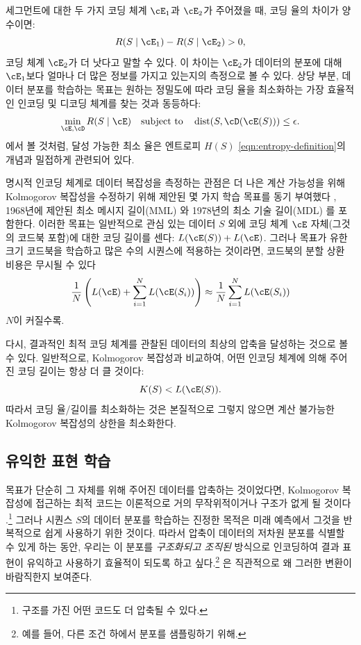 \documentclass[../../book-main_ko.tex]{subfiles}
\begin{document}
세그먼트에 대한 두 가지 코딩 체계 \(\cE_{1}\)과 \(\cE_{2}\)가 주어졌을 때, 코딩 율의 차이가 양수이면:
\begin{equation}
   R(S \mid \cE_{1}) -  R(S \mid \cE_{2}) > 0,
\end{equation}
코딩 체계 \(\cE_{2}\)가 더 낫다고 말할 수 있다. 이 차이는 \(\cE_{2}\)가 데이터의 분포에 대해 \(\cE_{1}\)보다 얼마나 더 많은 정보를 가지고 있는지의 측정으로 볼 수 있다. 상당 부분, 데이터 분포를 학습하는 목표는 원하는 정밀도에 따라 코딩 율을 최소화하는 가장 효율적인 인코딩 및 디코딩 체계를 찾는 것과 동등하다:
\begin{equation}
   \min_{\cE, \cD} R(S \mid \cE) \quad \text{subject to} \quad \operatorname{dist}(S, \cD(\cE(S))) \leq \epsilon.
\end{equation}
에서 볼 것처럼, 달성 가능한 최소 율은 엔트로피 \(H(S)\) \eqref{eqn:entropy-definition}의 개념과 밀접하게 관련되어 있다.


\begin{remark}\label{rem:computable-complexity}
    명시적 인코딩 체계로 데이터 복잡성을 측정하는 관점은 더 나은 계산 가능성을 위해 Kolmogorov 복잡성을 수정하기 위해 제안된 몇 가지 학습 목표를 동기 부여했다 \cite{WallaceC1999}, 1968년에 제안된 최소 메시지 길이(MML) \cite{WallaceC1968}와 1978년의 최소 기술 길이(MDL) \cite{Rissanen-1978,HansenM2001}를 포함한다. 이러한 목표는 일반적으로 관심 있는 데이터 \(S\) 외에 코딩 체계 \(\cE\) 자체(그것의 코드북 포함)에 대한 코딩 길이를 센다: \(L(\cE(S)) + L(\cE)\). 그러나 목표가 유한 크기 코드북을 학습하고 많은 수의 시퀀스에 적용하는 것이라면, 코드북의 분할 상환 비용은 무시될 수 있다
    \begin{equation}
        \frac{1}{N}\left( L(\cE) + \sum_{i=1}^{N} L(\cE(S_{i}))\right) \approx \frac{1}{N}\sum_{i=1}^{N} L(\cE(S_{i}))
    \end{equation}
    \(N\)이 커질수록.
\end{remark}

다시, 결과적인 최적 코딩 체계를 관찰된 데이터의 최상의 압축을 달성하는 것으로 볼 수 있다. 일반적으로, Kolmogorov 복잡성과 비교하여, 어떤 인코딩 체계에 의해 주어진 코딩 길이는 항상 더 클 것이다:
\begin{equation}
    K(S) < L(\cE(S)).
\end{equation}
따라서 코딩 율/길이를 최소화하는 것은 본질적으로 그렇지 않으면 계산 불가능한 Kolmogorov 복잡성의 상한을 최소화한다.

\subsection{유익한 표현 학습}
목표가 단순히 그 자체를 위해 주어진 데이터를 압축하는 것이었다면, Kolmogorov 복잡성에 접근하는 최적 코드는 이론적으로 거의 무작위적이거나 구조가 없게 될 것이다 \cite{Chaitin-1966}.\footnote{구조를 가진 어떤 코드도 더 압축될 수 있다.} 그러나 시퀀스 $S$의 데이터 분포를 학습하는 진정한 목적은 미래 예측에서 그것을 반복적으로 쉽게 사용하기 위한 것이다. 따라서 압축이 데이터의 저차원 분포를 식별할 수 있게 하는 동안, 우리는 이 분포를 \textit{구조화되고 조직된} 방식으로 인코딩하여 결과 표현이 유익하고 사용하기 효율적이 되도록 하고 싶다.\footnote{예를 들어, 다른 조건 하에서 분포를 샘플링하기 위해.} 은 직관적으로 왜 그러한 변환이 바람직한지 보여준다.
\end{document}
